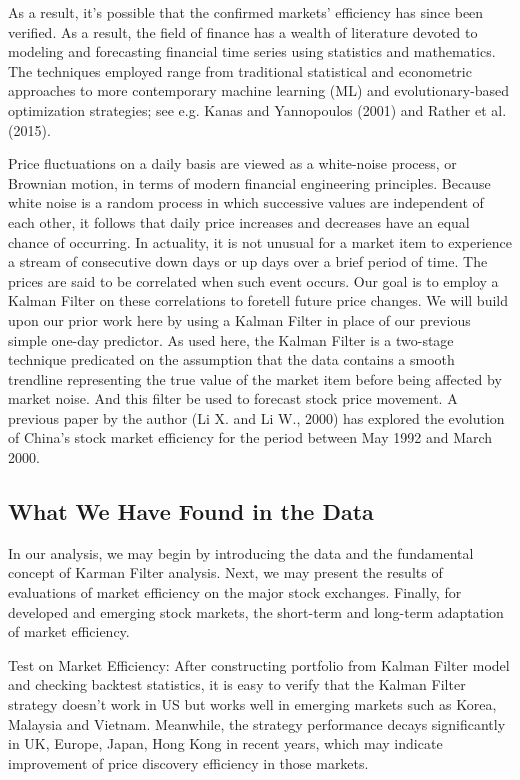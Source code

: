 As a result, it's possible that the confirmed markets' efficiency has since been verified. As a result, the field of finance has a wealth of literature devoted to modeling and forecasting financial time series using statistics and mathematics. The techniques employed range from traditional statistical and econometric approaches to more contemporary machine learning (ML) and evolutionary-based optimization strategies; see e.g. Kanas and Yannopoulos (2001)\cite{Kanas2001} and Rather et al. (2015)\cite{Rather2015}.

Price fluctuations on a daily basis are viewed as a white-noise process, or Brownian motion, in terms of modern financial engineering principles. Because white noise is a random process in which successive values are independent of each other, it follows that daily price increases and decreases have an equal chance of occurring. In actuality, it is not unusual for a market item to experience a stream of consecutive down days or up days over a brief period of time. The prices are said to be correlated when such event occurs. Our goal is to employ a Kalman Filter on these correlations to foretell future price changes. We will build upon our prior work here by using a Kalman Filter in place of our previous simple one-day predictor. As used here, the Kalman Filter is a two-stage technique predicated on the assumption that the data contains a smooth trendline representing the true value of the market item before being affected by market noise. And this filter be used to forecast stock price movement. A previous paper by the author (Li X. and Li W., 2000)\cite{Li2001} has explored the evolution of China's stock market efficiency for the period between May 1992 and March 2000.

\subsection{What We Have Found in the Data}
In our analysis, we may begin by introducing the data and the fundamental concept of Karman Filter analysis. Next, we may present the results of evaluations of market efficiency on the major stock exchanges. Finally, for developed and emerging stock markets, the short-term and long-term adaptation of market efficiency.

Test on Market Efficiency: After constructing portfolio from Kalman Filter model and checking backtest statistics, it is easy to verify that the Kalman Filter strategy doesn’t work in US but works well in emerging markets such as Korea, Malaysia and Vietnam. Meanwhile, the strategy performance decays significantly in UK, Europe, Japan, Hong Kong in recent years, which may indicate improvement of price discovery efficiency in those markets.


